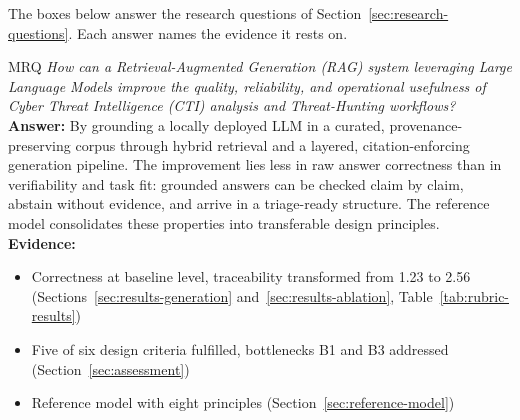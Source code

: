 The boxes below answer the research questions of
Section~\ref{sec:research-questions}. Each answer names the evidence it
rests on.

\begin{rqbox}{MRQ}
    \emph{How can a Retrieval-Augmented Generation (RAG) system
    leveraging Large Language Models improve the quality, reliability,
    and operational usefulness of Cyber Threat Intelligence (CTI)
    analysis and Threat-Hunting workflows?}\\[4pt]
    \textbf{Answer:} By grounding a locally deployed LLM in a curated,
    provenance-preserving corpus through hybrid retrieval and a layered,
    citation-enforcing generation pipeline. The improvement lies less in
    raw answer correctness than in verifiability and task fit: grounded
    answers can be checked claim by claim, abstain without evidence, and
    arrive in a triage-ready structure. The reference model consolidates
    these properties into transferable design principles.\\[4pt]
    \textbf{Evidence:}
    \begin{itemize}
        \item Correctness at baseline level, traceability transformed
              from 1.23 to 2.56 (Sections~\ref{sec:results-generation}
              and~\ref{sec:results-ablation},
              Table~\ref{tab:rubric-results})
        \item Five of six design criteria fulfilled, bottlenecks B1 and
              B3 addressed (Section~\ref{sec:assessment})
        \item Reference model with eight principles
              (Section~\ref{sec:reference-model})
    \end{itemize}
\end{rqbox}

